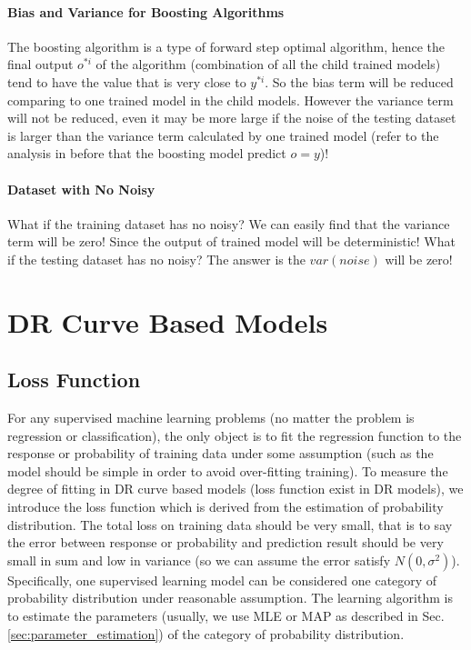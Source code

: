 \documentclass[runningheads,openany]{xhlPaper}
\begin{document}
\subsubsection{Bias and Variance for Boosting Algorithms}
The boosting algorithm is a type of forward step optimal algorithm, hence the final output $o^{*i}$ of the algorithm (combination of all the child trained models) tend to have the value that is very close to $y^{*i}$. So the bias term will be reduced comparing to one trained model in the child models. 
However the variance term will not be reduced, even it may be more large if the noise of the testing dataset is larger than the variance term calculated by one trained model (refer to the analysis in before that the boosting model predict $o=y$)!

\subsubsection{Dataset with No Noisy}
What if the training dataset has no noisy? 
We can easily find that the variance term will be zero! Since the output of trained model will be deterministic!
What if the testing dataset has no noisy?
The answer is the $var\left(noise\right)$ will be zero!

\chapter{DR Curve Based Models}

\section{Loss Function}
\label{sec:lossFunction}
For any supervised machine learning problems (no matter the problem is regression or classification), the only object is to fit the regression function to the response or probability of training data under some assumption (such as the model should be simple in order to avoid over-fitting training). To measure the degree of fitting in DR curve based models (loss function exist in DR models), we introduce the loss function which is derived from the estimation of probability distribution. The total loss on training data should be very small, that is to say the error between response or probability and prediction result should be very small in sum and low in variance (so we can assume the error satisfy $N\left( 0, \sigma ^2 \right)$). Specifically, one supervised learning model can be considered one category of probability distribution under reasonable assumption. The learning algorithm is to estimate the parameters (usually, we use MLE or MAP as described in Sec.\ref{sec:parameter_estimation}) of the category of probability distribution. 
\end{document}
